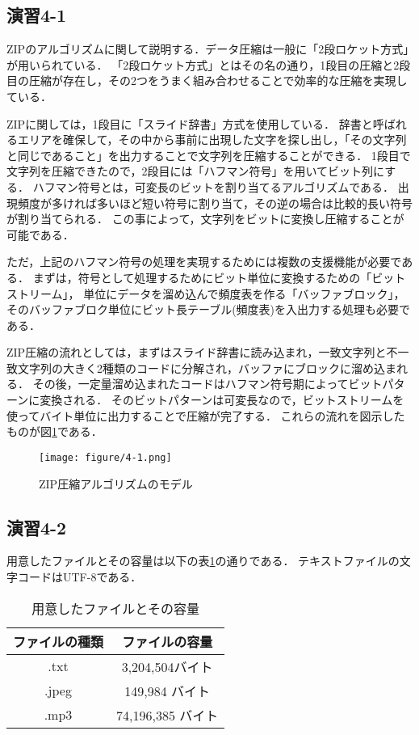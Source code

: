 \documentclass[documentclass]{jsarticle}
\begin{document}
\subsection*{演習4-1}
ZIPのアルゴリズムに関して説明する．データ圧縮は一般に「2段ロケット方式」が用いられている．
「2段ロケット方式」とはその名の通り，1段目の圧縮と2段目の圧縮が存在し，その2つをうまく組み合わせることで効率的な圧縮を実現している．

ZIPに関しては，1段目に「スライド辞書」方式を使用している．
辞書と呼ばれるエリアを確保して，その中から事前に出現した文字を探し出し，「その文字列と同じであること」を出力することで文字列を圧縮することができる．
1段目で文字列を圧縮できたので，2段目には「ハフマン符号」を用いてビット列にする．
ハフマン符号とは，可変長のビットを割り当てるアルゴリズムである．
出現頻度が多ければ多いほど短い符号に割り当て，その逆の場合は比較的長い符号が割り当てられる．
この事によって，文字列をビットに変換し圧縮することが可能である．

ただ，上記のハフマン符号の処理を実現するためには複数の支援機能が必要である．
まずは，符号として処理するためにビット単位に変換するための「ビットストリーム」，
単位にデータを溜め込んで頻度表を作る「バッファブロック」，
そのバッファブロク単位にビット長テーブル(頻度表)を入出力する処理も必要である．

ZIP圧縮の流れとしては，まずはスライド辞書に読み込まれ，一致文字列と不一致文字列の大きく2種類のコードに分解され，バッファにブロックに溜め込まれる．
その後，一定量溜め込まれたコードはハフマン符号期によってビットパターンに変換される．
そのビットパターンは可変長なので，ビットストリームを使ってバイト単位に出力することで圧縮が完了する．
これらの流れを図示したものが図\ref*{fig:4-1}である．
\begin{figure}[H]
  \begin{center}
    \texttt{[image: figure/4-1.png]}
  \end{center}
  \caption{ZIP圧縮アルゴリズムのモデル}
  \label{fig:4-1}
\end{figure}

\subsection*{演習4-2}
用意したファイルとその容量は以下の表\ref*{tb:4-1}の通りである．
テキストファイルの文字コードはUTF-8である．
\begin{table}[H]
  \begin{center}
    \caption{用意したファイルとその容量}
    \label{tb:4-1}
    \begin{tabular}{|cc|} \hline
     ファイルの種類 & ファイルの容量 \\ \hline
     .txt    & 3,204,504バイト \\
     .jpeg   & 149,984 バイト \\
     .mp3    & 74,196,385 バイト \\ \hline
    \end{tabular}
  \end{center}
\end{table}
\end{document}
